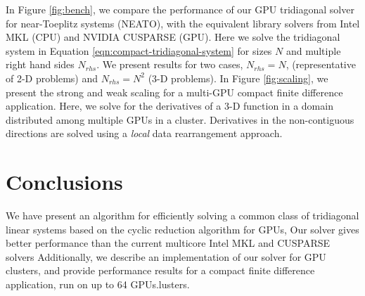 \documentclass[letterpaper,10pt]{article}
\begin{document}
In Figure \ref{fig:bench},
we compare the performance of our GPU tridiagonal solver
for near-Toeplitz systems (NEATO),
with the equivalent library solvers from
Intel MKL (CPU) and NVIDIA CUSPARSE (GPU).
Here we solve the tridiagonal system in
Equation \ref{eqn:compact-tridiagonal-system}
for sizes $N$ and multiple right hand sides $N_{rhs}$.
We present results for two cases, $N_{rhs}=N$,
(representative of 2-D problems)
and $N_{rhs}=N^2$ (3-D problems).
In Figure \ref{fig:scaling},
we present the strong and weak scaling for a
multi-GPU compact finite difference application.
Here, we solve for the derivatives of a 3-D function
in a domain distributed among multiple GPUs in a cluster.
Derivatives in the non-contiguous directions are solved
using a \emph{local} data rearrangement approach.

\section{Conclusions}

We have present an algorithm
for efficiently solving a common class of
tridiagonal linear systems
based on the cyclic reduction algorithm for GPUs,
Our solver gives better performance than
the current multicore Intel MKL and CUSPARSE solvers
Additionally, we describe an implementation of our solver
for GPU clusters,
and provide performance results for a
compact finite difference application,
run on up to 64 GPUs.lusters.
\end{document}
